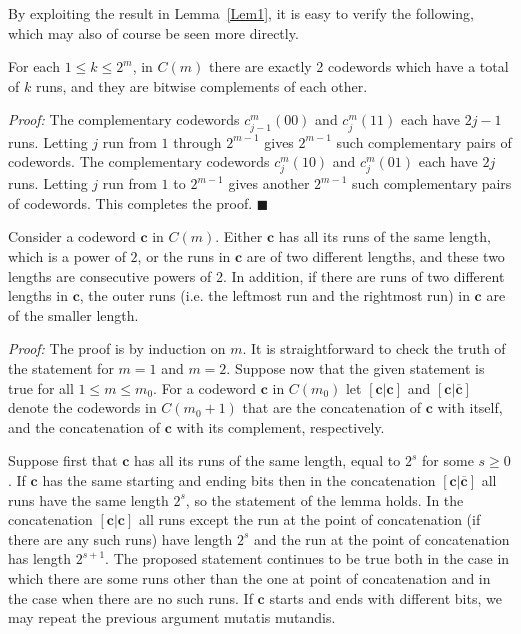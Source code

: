 By exploiting the result in Lemma~\ref{Lem1},
it is easy to verify
the following, which may also of course
be seen more directly.

\begin{lemma}\label{LE2}
For each $1 \leq k \leq 2^m$,
in $C(m)$ there are exactly 2 codewords which have a total of $k$
runs, and they are bitwise complements of each
other.
\end{lemma}

\noindent \textit{Proof:} The complementary codewords
$c_{j-1}^m(00)$ and $c_{j}^m(11)$ each have $2j-1$ runs. Letting
$j$ run from $1$ through $2^{m-1}$ gives $2^{m-1}$ such
complementary pairs of codewords. The complementary codewords
$c_j^m(10)$ and $c_j^m(01)$ each have
 $2j$ runs. Letting
$j$ run from $1$ to $2^{m-1}$
gives another
$2^{m-1}$ such complementary pairs
of codewords.
This completes the proof. \hfill $\blacksquare$


\begin{lemma}\label{LE3}
Consider a codeword $\mathbf{c}$ in $C(m)$. Either $\mathbf{c}$
has all its runs of the same length, which is a power of $2$, or
the runs in $\mathbf{c}$ are of two different lengths, and these
two lengths are consecutive powers of 2. In addition, if there are
runs of two different lengths in $\mathbf{c}$, the outer runs
(i.e. the leftmost run and the rightmost run) in $\mathbf{c}$ are
of the smaller length.
\end{lemma}

\noindent \textit{Proof:} The proof is by induction on $m$. It is
straightforward to check the truth of the statement for $m=1$ and
$m=2$. Suppose now that the given statement is true for all $1 \le
m \le m_0$. For a codeword $\mathbf{c}$ in $C(m_0)$ let
$[\mathbf{c} | \mathbf{c}]$ and $[\mathbf{c} |
\mathbf{\overline{c}}]$ denote the codewords in $C(m_0+1)$ that
are the concatenation of $\mathbf{c}$ with itself, and the
concatenation of $\mathbf{c}$ with its complement, respectively.

Suppose first that $\mathbf{c}$ has all its runs of the same
length, equal to $2^s$ for some $s \ge 0$. If $\mathbf{c}$ has the
same starting and ending bits then in the concatenation
$[\mathbf{c} | \mathbf{\overline{c}}]$ all runs have the same
length $2^s$, so the statement of the lemma holds. In the
concatenation $[\mathbf{c} | \mathbf{c}]$ all runs except the run
at the point of concatenation (if there are any such runs) have
length $2^s$ and the run at the point of concatenation has length
$2^{s+1}$. The proposed statement continues to be true both in the
case in which there are some runs other than the one at point of
concatenation and in the case when there are no such runs. If
$\mathbf{c}$ starts and ends with different bits, we may repeat
the previous argument mutatis mutandis.

